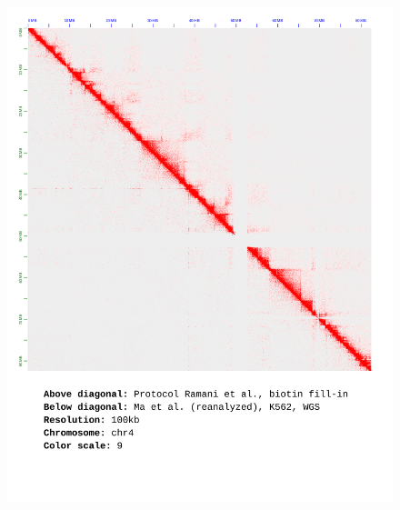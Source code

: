 \documentclass[a4paper,14pt]{extarticle}
\begin{document}
\begin{figure}[hp!] \includegraphics[width=1\textwidth]{ma-wgs_s30_chr4_100kb_9.pdf} \end{figure}
\end{document}
